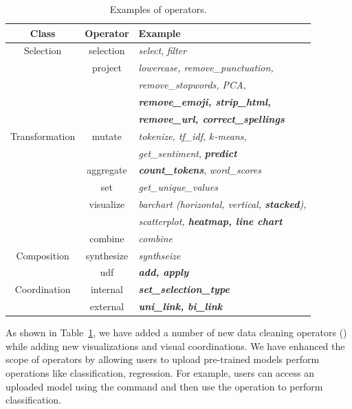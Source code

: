 \begin{table}[]\scriptsize
\caption{Examples of \vta operators.}
\begin{tabular}{ccl}
\textbf{Class} & \textbf{Operator} & \textbf{Example} \\ \hline
  Selection    &     selection     &  \textit{select}, \textit{filter}       \\ \hline
            &     project     &   \textit{lowercase, remove\_punctuation,} \\ 
            & & \textit{remove\_stopwords, PCA,}       \\
            & & \textbf{\textit{remove\_emoji, strip\_html,}} \\
            & & \textbf{\textit{remove\_url, correct\_spellings}}\\
    Transformation            &     mutate     &   \textit{tokenize, tf\_idf, $k$-means,} \\ 
               & & \textit{get\_sentiment}, \textbf{\textit{predict}}      \\
                &     aggregate & \textit{\textbf{count\_tokens}}, \textit{word\_scores}        \\
                &     set &  \textit{get\_unique\_values}       \\
                &     visualize     &    \textit{barchart (horizontal, vertical, \textbf{stacked}),}\\
                & &  \textit{scatterplot, \textbf{heatmap, line chart}}     \\ \hline
                &     combine     &  \textit{combine}       \\
    Composition            &     synthesize     &   \textit{synthseize}      \\
                &     udf     &    \textit{\textbf{add, apply}}     \\ \hline
       Coordination      &    internal      &  \textit{\textbf{set\_selection\_type}}       \\
        &     external     &  \textit{\textbf{uni\_link, bi\_link}}       \\ \hline
\end{tabular}
\label{tab:operators}
\end{table}

As shown in Table~\ref{tab:operators}, we have added a number of new data cleaning operators () while adding new visualizations and visual coordinations.
We have enhanced the scope of  operators by allowing users to upload pre-trained models perform operations like classification, regression. For example, users can access an uploaded model using the  command and then use the  operation to perform classification.

